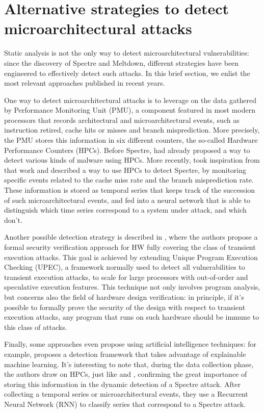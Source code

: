\documentclass[12pt,a4paper]{book}
\theoremstyle{definition}
\begin{document}
	\section{Alternative strategies to detect microarchitectural attacks}\label{sec:alternatives}
	Static analysis is not the only way to detect microarchitectural vulnerabilities: since the discovery of Spectre and Meltdown, different strategies have been engineered to effectively detect such attacks. In this brief section, we enlist the most relevant approaches published in recent years.
	
	One way to detect microarchitectural attacks is to leverage on the data gathered by Performance Monitoring Unit (PMU), a component featured in most modern processors that records architectural and microarchitectural events, such as instruction retired, cache hits or misses and branch misprediction. More precisely, the PMU stores this information in six different counters, the so-called Hardware Performance Counters (HPCs). Before Spectre, \cite{Demme2013} had already proposed a way to detect various kinds of malware using HPCs. More recently, \cite{Congmiao2022} took inspiration from that work and described a way to use HPCs to detect Spectre, by monitoring specific events related to the cache miss rate and the branch misprediction rate. These information is stored as temporal series that keeps track of the succession of such microarchitectural events, and fed into a neural network that is able to distinguish which time series correspond to a system under attack, and which don't.
	
	Another possible detection strategy is described in \cite{Fadiheh2020}, where the authors propose a formal security verification approach for HW fully covering the class of transient execution attacks. This goal is achieved by extending Unique Program Execution Checking (UPEC), a framework normally used to detect all vulnerabilities to transient execution attacks, to scale for large processors with out-of-order and speculative execution features.
	This technique not only involves program analysis, but concerns also the field of hardware design verification: in principle, if it's possible to formally prove the security of the design with respect to transient execution attacks, any program that runs on such hardware should be immune to this class of attacks. 
	
	Finally, some approaches even propose using artificial intelligence techniques: for example, \cite{Pan2021} proposes a detection framework that takes advantage of explainable machine learning. It's interesting to note that, during the data collection phase, the authors draw on HPCs, just like \cite{Congmiao2022} and \cite{Demme2013}, confirming the great importance of storing this information in the dynamic detection of a Spectre attack. After collecting a temporal series or microarchitectural events, they use a Recurrent Neural Network (RNN) to classify series that correspond to a Spectre attack.
	
\end{document}
